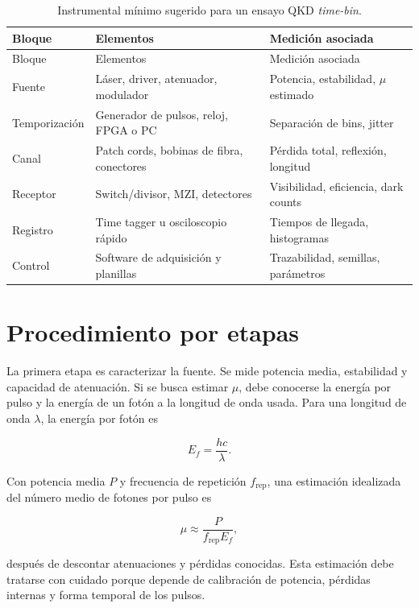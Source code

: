 \begin{longtable}{p{}p{}p{}}
  \caption{Instrumental mínimo sugerido para un ensayo QKD \textit{time-bin}.}
  \label{tab:instrumental_ensayo}\\
  \toprule
  Bloque & Elementos & Medición asociada \\
  \midrule
  \endfirsthead
  \toprule
  Bloque & Elementos & Medición asociada \\
  \midrule
  \endhead
  Fuente & Láser, driver, atenuador, modulador & Potencia, estabilidad, \(\mu\) estimado \\
  Temporización & Generador de pulsos, reloj, FPGA o PC & Separación de bins, jitter \\
  Canal & Patch cords, bobinas de fibra, conectores & Pérdida total, reflexión, longitud \\
  Receptor & Switch/divisor, MZI, detectores & Visibilidad, eficiencia, dark counts \\
  Registro & Time tagger u osciloscopio rápido & Tiempos de llegada, histogramas \\
  Control & Software de adquisición y planillas & Trazabilidad, semillas, parámetros \\
  \bottomrule
\end{longtable}

\section{Procedimiento por etapas}

La primera etapa es caracterizar la fuente. Se mide potencia media, estabilidad y capacidad de atenuación. Si se busca estimar \(\mu\), debe conocerse la energía por pulso y la energía de un fotón a la longitud de onda usada. Para una longitud de onda \(\lambda\), la energía por fotón es

\begin{equation}
  E_f = \frac{hc}{\lambda}.
\end{equation}

Con potencia media \(P\) y frecuencia de repetición \(f_\text{rep}\), una estimación idealizada del número medio de fotones por pulso es

\begin{equation}
  \mu \approx \frac{P}{f_\text{rep}E_f},
\end{equation}

después de descontar atenuaciones y pérdidas conocidas. Esta estimación debe tratarse con cuidado porque depende de calibración de potencia, pérdidas internas y forma temporal de los pulsos.

